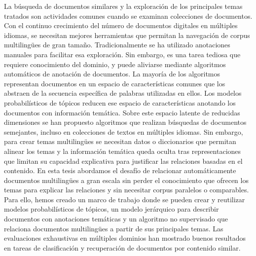 \cleardoublepage
\begin{abstractslongSpanish}
La búsqueda de documentos similares y la exploración de los principales temas tratados son actividades comunes cuando se examinan colecciones de documentos. Con el continuo crecimiento del número de documentos digitales en múltiples idiomas, se necesitan mejores herramientas que permitan la navegación de corpus multilingües de gran tamaño. Tradicionalmente se ha utilizado anotaciones manuales para facilitar esa exploración. Sin embargo, es una tarea tediosa que requiere conocimiento del dominio, y puede aliviarse mediante algoritmos automáticos de anotación de documentos. La mayoría de los algoritmos representan documentos en un espacio de características comunes que los abstraen de la secuencia específica de palabras utilizadas en ellos. Los modelos probabilísticos de tópicos reducen ese espacio de características anotando los documentos con información temática. Sobre este espacio latente de reducidas dimensiones se han propuesto algoritmos que realizan búsquedas de documentos semejantes, incluso en colecciones de textos en múltiples idiomas. Sin embargo, para crear temas multilingües se necesitan datos o diccionarios que permitan alinear los temas y la información temática queda oculta tras representaciones que limitan su capacidad explicativa para justificar las relaciones basadas en el contenido. En esta tesis abordamos el desafío de relacionar automáticamente documentos multilingües a gran escala sin perder el conocimiento que ofrecen los temas para explicar las relaciones y sin necesitar corpus paralelos o comparables. Para ello, hemos creado un marco de trabajo donde se pueden crear y reutilizar modelos probabilísticos de tópicos, un modelo jerárquico para describir documentos con anotaciones temáticas y un algoritmo no supervisado que relaciona documentos multilingües a partir de sus principales temas. Las evaluaciones exhaustivas en múltiples dominios han mostrado buenos resultados en tareas de clasificación y recuperación de documentos por contenido similar. 

\end{abstractslongSpanish}
